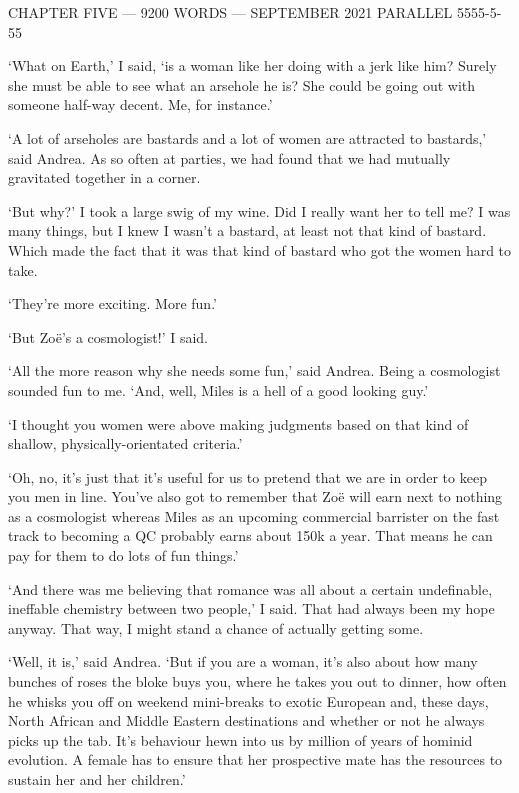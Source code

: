 {\parindent=0pt {\obeylines
{\twelvess CHAPTER FIVE --- 9200 WORDS --- SEPTEMBER 2021}
{\twelvess PARALLEL 5555-5-55}}
\vskip 1cm

\twelverm
`What on Earth,' I said, `is a woman like her doing with a
jerk like him? Surely she must be able to see what an arsehole he
is? She could be going out with someone half-way decent. Me, for
instance.'}

`A lot of arseholes are bastards and a lot of women are attracted to
bastards,' said Andrea. As so often at parties, we
had found that we had mutually gravitated together in a corner.

`But why?' I took a large swig of my wine. Did I really want her to
tell me? I was many things, but I knew I wasn't a bastard, at least not that kind of bastard. Which
made the fact that it was that kind of bastard who got the women hard to
take.

`They're more exciting. More fun.'

`But Zo{\"e}'s a cosmologist!' I said.

`All the more reason why she needs some fun,' said Andrea. Being a cosmologist
sounded fun to me. `And, well, Miles is a hell of a good looking
guy.'

`I thought you women were above making judgments based on that kind of shallow, physically-orientated criteria.'

`Oh, no, it's just that it's useful for us to pretend
that we are in order to keep you men in line. You've also got to
remember that Zo{\"e} will earn next to nothing as a cosmologist whereas Miles as an
upcoming commercial barrister on the fast track to becoming a QC probably earns about 150k a year.
That means he can pay for them to do lots of fun things.'

`And there was me believing that romance was all about a certain undefinable, ineffable
chemistry between two people,' I said. That had always been my hope anyway.
That way, I might stand a chance of actually getting some.

`Well, it is,' said Andrea. `But if you are a woman, it's also about how many
bunches of roses the bloke buys you, where he takes you out to dinner,
how often he whisks you off on weekend mini-breaks to exotic
European and, these days, North African and Middle Eastern destinations and whether or not he {\twelveit always\/}
picks up the tab.
It's behaviour hewn into us by million of years of hominid
evolution. A female has to ensure that her prospective mate has the resources
to sustain her and her children.'

